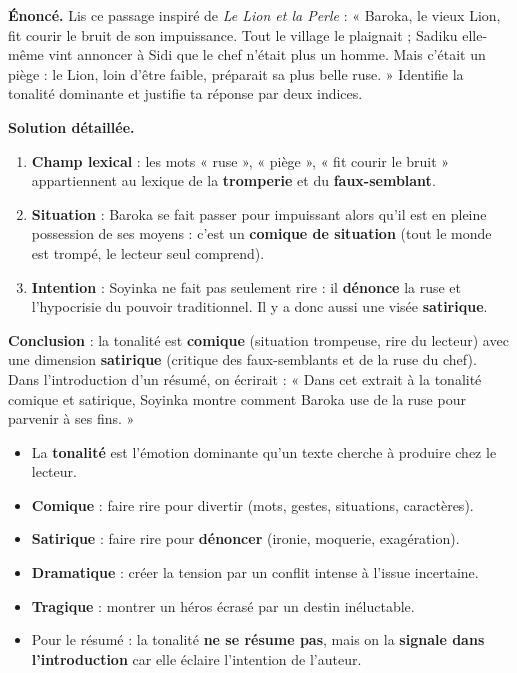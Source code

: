 \documentclass[11pt]{article}
\begin{document}
\begin{exoresolu}
\textbf{Énoncé.} Lis ce passage inspiré de \emph{Le Lion et la Perle} : « Baroka, le vieux Lion, fit courir le bruit de son impuissance. Tout le village le plaignait ; Sadiku elle-même vint annoncer à Sidi que le chef n'était plus un homme. Mais c'était un piège : le Lion, loin d'être faible, préparait sa plus belle ruse. » Identifie la tonalité dominante et justifie ta réponse par deux indices.

\tcblower
\textbf{Solution détaillée.}
\begin{enumerate}
\item \textbf{Champ lexical} : les mots « ruse », « piège », « fit courir le bruit » appartiennent au lexique de la \textbf{tromperie} et du \textbf{faux-semblant}.
\item \textbf{Situation} : Baroka se fait passer pour impuissant alors qu'il est en pleine possession de ses moyens : c'est un \textbf{comique de situation} (tout le monde est trompé, le lecteur seul comprend).
\item \textbf{Intention} : Soyinka ne fait pas seulement rire : il \textbf{dénonce} la ruse et l'hypocrisie du pouvoir traditionnel. Il y a donc aussi une visée \textbf{satirique}.
\end{enumerate}
\textbf{Conclusion} : la tonalité est \textbf{comique} (situation trompeuse, rire du lecteur) avec une dimension \textbf{satirique} (critique des faux-semblants et de la ruse du chef). Dans l'introduction d'un résumé, on écrirait : « Dans cet extrait à la tonalité comique et satirique, Soyinka montre comment Baroka use de la ruse pour parvenir à ses fins. »
\end{exoresolu}

\begin{aretenir}
\begin{itemize}
\item La \textbf{tonalité} est l'émotion dominante qu'un texte cherche à produire chez le lecteur.
\item \textbf{Comique} : faire rire pour divertir (mots, gestes, situations, caractères).
\item \textbf{Satirique} : faire rire pour \textbf{dénoncer} (ironie, moquerie, exagération).
\item \textbf{Dramatique} : créer la tension par un conflit intense à l'issue incertaine.
\item \textbf{Tragique} : montrer un héros écrasé par un destin inéluctable.
\item Pour le résumé : la tonalité \textbf{ne se résume pas}, mais on la \textbf{signale dans l'introduction} car elle éclaire l'intention de l'auteur.
\end{itemize}
\end{aretenir}
\end{document}
